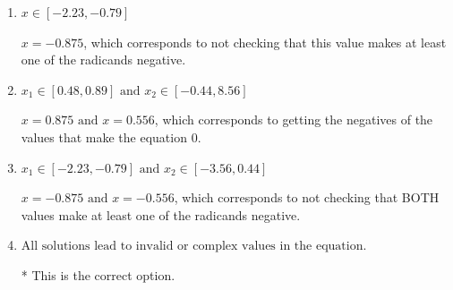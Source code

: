 \documentclass{extbook}[14pt]
\begin{document}
\begin{enumerate}
{\begin{enumerate}[label=\Alph*.]
$x = -0.556$, which corresponds to not checking that this value makes at least one of the radicands negative.
\item \( x \in [-2.23,-0.79] \)

$x = -0.875$, which corresponds to not checking that this value makes at least one of the radicands negative.
\item \( x_1 \in [0.48, 0.89] \text{ and } x_2 \in [-0.44,8.56] \)

$x = 0.875 \text{ and } x = 0.556$, which corresponds to getting the negatives of the values that make the equation 0.
\item \( x_1 \in [-2.23, -0.79] \text{ and } x_2 \in [-3.56,0.44] \)

$x = -0.875 \text{ and } x = -0.556$, which corresponds to not checking that BOTH values make at least one of the radicands negative.
\item \( \text{All solutions lead to invalid or complex values in the equation.} \)

* This is the correct option.
\end{enumerate}

}
\end{enumerate}
\end{document}
